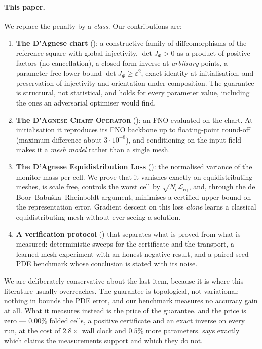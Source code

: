 \documentclass[11pt,a4paper]{article}
\theoremstyle{plain}
\theoremstyle{definition}
\newcommand{\detJ}{\det J_\Phi}
\newcommand{\Leq}{\mathcal{L}_{\mathrm{eq}}}
\newcommand{\DAO}{\textsc{D'Agnese Chart Operator}}
\begin{document}
\paragraph{This paper.}  We replace the penalty by a \emph{class}.  Our
contributions are:

\begin{enumerate}
\item \textbf{The D'Agnese chart} (): a constructive family of
  diffeomorphisms of the reference square with global injectivity, $\detJ>0$ as
  a product of positive factors (no cancellation), a closed-form inverse at
  \emph{arbitrary} points, a parameter-free lower bound $\detJ\ge\varepsilon^2$,
  exact identity at initialisation, and preservation of injectivity and
  orientation under composition. The guarantee is structural, not statistical,
  and holds for every parameter value,
  including the ones an adversarial optimiser would find.
\item \textbf{The \DAO} (): an FNO evaluated on the chart.
  At initialisation it reproduces its FNO backbone up to floating-point
  round-off (maximum difference about $3\cdot10^{-8}$), and conditioning on
  the input field makes it a \emph{mesh model} rather than a single mesh.
\item \textbf{The D'Agnese Equidistribution Loss} (): the
  normalised variance of the monitor mass per cell.  We prove that it vanishes
  exactly on equidistributing meshes, is scale free, controls the worst cell by
  $\sqrt{N_c\Leq}$, and, through the de Boor–Babuška–Rheinboldt argument,
  minimises a certified upper bound on the representation error.  Gradient
  descent on this loss \emph{alone} learns a classical equidistributing mesh
  without ever seeing a solution.
\item \textbf{A verification protocol} () that separates
  what is proved from what is measured: deterministic sweeps for the
  certificate and the transport, a learned-mesh experiment with an honest
  negative result, and a paired-seed PDE benchmark whose conclusion is stated
  with its noise.
\end{enumerate}

We are deliberately conservative about the last item, because it is where this
literature usually overreaches.  The guarantee is topological, not variational:
nothing in  bounds the PDE error, and our benchmark
measures no accuracy gain at all.  What it measures instead is the price of the
guarantee, and the price is zero --- $0.00\%$ folded cells, a positive
certificate and an exact inverse on every run, at the cost of $2.8\times$ wall
clock and $0.5\%$ more parameters.   says exactly which
claims the measurements support and which they do not.
\end{document}

